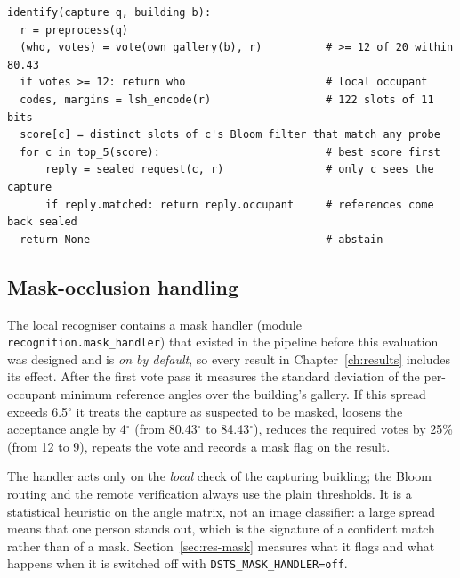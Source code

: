 \documentclass[12pt,a4paper,oneside]{report}
\begin{document}
{\small
\begin{verbatim}
identify(capture q, building b):
  r = preprocess(q)
  (who, votes) = vote(own_gallery(b), r)          # >= 12 of 20 within 80.43
  if votes >= 12: return who                      # local occupant
  codes, margins = lsh_encode(r)                  # 122 slots of 11 bits
  score[c] = distinct slots of c's Bloom filter that match any probe
  for c in top_5(score):                          # best score first
      reply = sealed_request(c, r)                # only c sees the capture
      if reply.matched: return reply.occupant     # references come back sealed
  return None                                     # abstain
\end{verbatim}}

\subsection{Mask-occlusion handling}\label{sec:mask-handler}
The local recogniser contains a mask handler (module \texttt{recognition.mask\_\allowbreak handler}) that existed in the pipeline before this evaluation was designed and is \emph{on by default}, so every result in Chapter~\ref{ch:results} includes its effect. After the first vote pass it measures the standard deviation of the per-occupant minimum reference angles over the building's gallery. If this spread exceeds 6.5$^{\circ}$ it treats the capture as suspected to be masked, loosens the acceptance angle by 4$^{\circ}$ (from 80.43$^{\circ}$ to 84.43$^{\circ}$), reduces the required votes by 25\% (from 12 to 9), repeats the vote and records a mask flag on the result.

The handler acts only on the \emph{local} check of the capturing building; the Bloom routing and the remote verification always use the plain thresholds. It is a statistical heuristic on the angle matrix, not an image classifier: a large spread means that one person stands out, which is the signature of a confident match rather than of a mask. Section~\ref{sec:res-mask} measures what it flags and what happens when it is switched off with \texttt{DSTS\_\allowbreak MASK\_\allowbreak HANDLER=off}.
\end{document}
